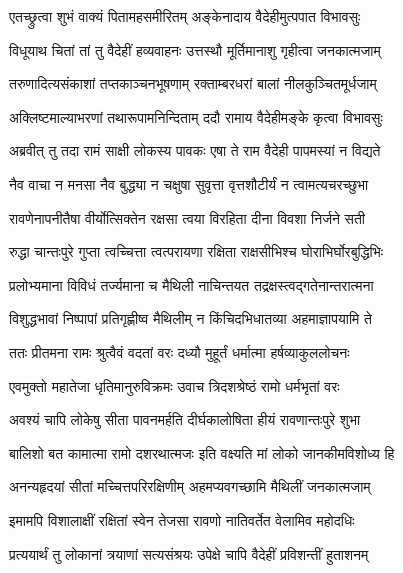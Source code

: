 
\twolineshloka
{एतच्छ्रुत्वा शुभं वाक्यं पितामहसमीरितम्}
{अङ्केनादाय वैदेहीमुत्पपात विभावसुः} %

\twolineshloka
{विधूयाथ चितां तां तु वैदेहीं हव्यवाहनः}
{उत्तस्थौ मूर्तिमानाशु गृहीत्वा जनकात्मजाम्} %

\twolineshloka
{तरुणादित्यसंकाशां तप्तकाञ्चनभूषणाम्}
{रक्ताम्बरधरां बालां नीलकुञ्चितमूर्धजाम्} %

\twolineshloka
{अक्लिष्टमाल्याभरणां तथारूपामनिन्दिताम्}
{ददौ रामाय वैदेहीमङ्के कृत्वा विभावसुः} %

\twolineshloka
{अब्रवीत् तु तदा रामं साक्षी लोकस्य पावकः}
{एषा ते राम वैदेही पापमस्यां न विद्यते} %

\twolineshloka
{नैव वाचा न मनसा नैव बुद्ध्या न चक्षुषा}
{सुवृत्ता वृत्तशौटीर्यं न त्वामत्यचरच्छुभा} %

\twolineshloka
{रावणेनापनीतैषा वीर्योत्सिक्तेन रक्षसा}
{त्वया विरहिता दीना विवशा निर्जने सती} %

\twolineshloka
{रुद्धा चान्तःपुरे गुप्ता त्वच्चित्ता त्वत्परायणा}
{रक्षिता राक्षसीभिश्च घोराभिर्घोरबुद्धिभिः} %

\twolineshloka
{प्रलोभ्यमाना विविधं तर्ज्यमाना च मैथिली}
{नाचिन्तयत तद्रक्षस्त्वद्गतेनान्तरात्मना} %

\twolineshloka
{विशुद्धभावां निष्पापां प्रतिगृह्णीष्व मैथिलीम्}
{न किंचिदभिधातव्या अहमाज्ञापयामि ते} %

\twolineshloka
{ततः प्रीतमना रामः श्रुत्वैवं वदतां वरः}
{दध्यौ मुहूर्तं धर्मात्मा हर्षव्याकुललोचनः} %

\twolineshloka
{एवमुक्तो महातेजा धृतिमानुरुविक्रमः}
{उवाच त्रिदशश्रेष्ठं रामो धर्मभृतां वरः} %

\twolineshloka
{अवश्यं चापि लोकेषु सीता पावनमर्हति}
{दीर्घकालोषिता हीयं रावणान्तःपुरे शुभा} %

\twolineshloka
{बालिशो बत कामात्मा रामो दशरथात्मजः}
{इति वक्ष्यति मां लोको जानकीमविशोध्य हि} %

\twolineshloka
{अनन्यहृदयां सीतां मच्चित्तपरिरक्षिणीम्}
{अहमप्यवगच्छामि मैथिलीं जनकात्मजाम्} %

\twolineshloka
{इमामपि विशालाक्षीं रक्षितां स्वेन तेजसा}
{रावणो नातिवर्तेत वेलामिव महोदधिः} %

\twolineshloka
{प्रत्ययार्थं तु लोकानां त्रयाणां सत्यसंश्रयः}
{उपेक्षे चापि वैदेहीं प्रविशन्तीं हुताशनम्} %

